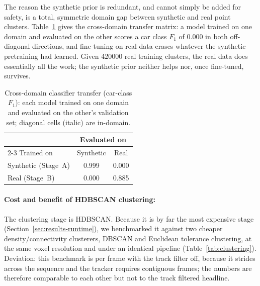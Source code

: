 \documentclass[a4paper,12pt]{report}
\begin{document}
The reason the synthetic prior is redundant, and cannot simply be added for
safety, is a total, symmetric domain gap between synthetic and real point
clusters. Table~\ref{tab:cross-domain} gives the cross-domain
transfer matrix: a model trained on one domain and evaluated on the other scores
a car class $F_1$ of \num{0.000} in both off-diagonal directions, and
fine-tuning on real data erases whatever the synthetic pretraining had learned.
Given \num{420000} real training clusters, the real data does essentially all the
work; the synthetic prior neither helps nor, once fine-tuned, survives.

\begin{table}[H]
  \centering
  \caption[Cross-domain classifier transfer]{Cross-domain classifier transfer (car-class
    $F_1$): each model trained on one domain and evaluated on the other's validation set;
    diagonal cells (italic) are in-domain.}
  \label{tab:cross-domain}
  \begin{tabular}{lcc}
    \toprule
    & \multicolumn{2}{c}{Evaluated on} \\
    \cmidrule(lr){2-3}
    Trained on & Synthetic & Real \\
    \midrule
    Synthetic (Stage~A) & 0.999 & 0.000 \\
    Real (Stage~B)      & 0.000        & 0.885 \\
    \bottomrule
  \end{tabular}
\end{table}

\paragraph{Cost and benefit of HDBSCAN clustering:}
\label{sec:ablation-clustering}

The clustering stage is HDBSCAN. Because it is by far the most expensive stage
(Section~\ref{sec:results-runtime}), we benchmarked it against two cheaper
density/connectivity clusterers, DBSCAN and Euclidean tolerance clustering,
at the same voxel resolution and under an identical pipeline
(Table~\ref{tab:clustering}). Deviation: this benchmark is
per frame with the track filter off, because it strides across the
sequence and the tracker requires contiguous frames; the numbers are therefore
comparable to each other but not to the track filtered headline.
\end{document}
